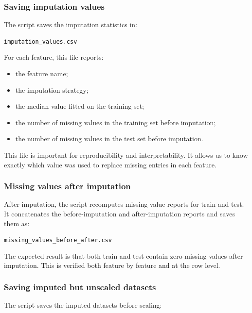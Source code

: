 \documentclass{ipgpmaster}
\begin{document}
\subsubsection{Saving imputation values}

The script saves the imputation statistics in:

\begin{center}
\texttt{imputation\_values.csv}
\end{center}

For each feature, this file reports:

\begin{itemize}
    \item the feature name;
    \item the imputation strategy;
    \item the median value fitted on the training set;
    \item the number of missing values in the training set before imputation;
    \item the number of missing values in the test set before imputation.
\end{itemize}

This file is important for reproducibility and interpretability. It allows us to know exactly which value was used to replace missing entries in each feature.

\subsubsection{Missing values after imputation}

After imputation, the script recomputes missing-value reports for train and test. It concatenates the before-imputation and after-imputation reports and saves them as:

\begin{center}
\texttt{missing\_values\_before\_after.csv}
\end{center}

The expected result is that both train and test contain zero missing values after imputation. This is verified both feature by feature and at the row level.

\subsubsection{Saving imputed but unscaled datasets}

The script saves the imputed datasets before scaling:
\end{document}
